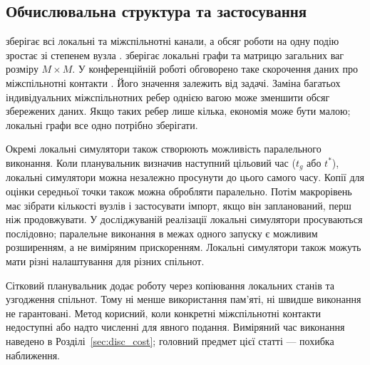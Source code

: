 \subsection{Обчислювальна структура та застосування}
\label{sec:cost}

\Full{} зберігає всі локальні та міжспільнотні канали, а обсяг роботи на одну подію зростає зі степенем вузла \citep{kuryliak2025simulating}. \TS{} зберігає локальні графи та матрицю загальних ваг розміру $M\times M$. У конференційній роботі обговорено таке скорочення даних про міжспільнотні контакти \citep{kuryliak2025towards}. Його значення залежить від задачі. Заміна багатьох індивідуальних міжспільнотних ребер однією вагою може зменшити обсяг збережених даних. Якщо таких ребер лише кілька, економія може бути малою; локальні графи все одно потрібно зберігати.

Окремі локальні симулятори також створюють можливість паралельного виконання. Коли планувальник визначив наступний цільовий час ($t_g$ або $t^\ast$), локальні симулятори можна незалежно просунути до цього самого часу. Копії для оцінки середньої точки також можна обробляти паралельно. Потім макрорівень має зібрати кількості вузлів і застосувати імпорт, якщо він запланований, перш ніж продовжувати. У досліджуваній реалізації локальні симулятори просуваються послідовно; паралельне виконання в межах одного запуску є можливим розширенням, а не виміряним прискоренням. Локальні симулятори також можуть мати різні налаштування для різних спільнот.

Сітковий планувальник додає роботу через копіювання локальних станів та узгодження спільнот. Тому ні менше використання пам'яті, ні швидше виконання не гарантовані. Метод корисний, коли конкретні міжспільнотні контакти недоступні або надто численні для явного подання. Виміряний час виконання наведено в Розділі~\ref{sec:disc_cost}; головний предмет цієї статті --- похибка наближення.

\clearpage
\endgroup

\clearpage
